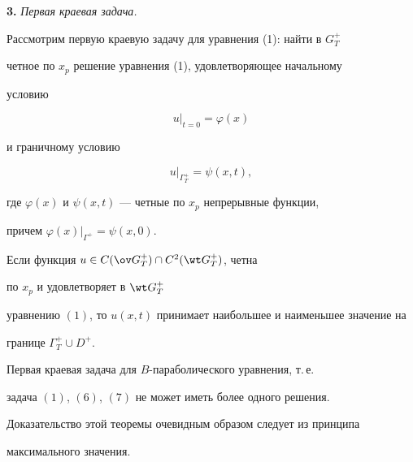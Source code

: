  


{\bf 3.} {\it Первая краевая задача.} 


Рассмотрим первую краевую задачу для уравнения (1): найти в $G^+_T$ 


четное по $x_p$ решение уравнения (1), удовлетворяющее начальному 


условию 


\begin{equation} 


u|_{t=0}=\varphi(x) 


\end{equation} 


и граничному условию 


\begin{equation} 


u|_{\Gamma^+_T}=\psi(x,t), 


\end{equation} 


где $\varphi(x)$ и $\psi(x,t)$ --- четные по $x_p$ непрерывные функции, 


причем $\varphi(x)|_{\Gamma^+}=\psi(x,0)$. 


 


\begin{thm} Если функция $u\in C(\ov G^+_T)\cap C^2(\wt G^+_T)$, четна 


по $x_p$ и удовлетворяет в $\wt G^+_T$ 


уравнению $(1)$, то $u(x,t)$ принимает наибольшее и наименьшее значение на 


границе $\Gamma^+_T\cup D^+$. 


\end{thm} 


 


\begin{thm} 


Первая краевая задача для $B$-параболического уравнения, т.\,е. 


задача $(1)$, $(6)$, $(7)$ не может иметь более одного решения. 


\end{thm} 


 


Доказательство этой теоремы очевидным образом следует из принципа 


максимального значения. 


